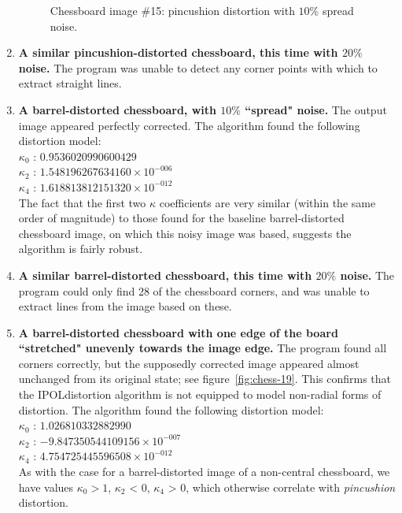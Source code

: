 \begin{enumerate}
\begin{figure}[h]
  \caption{Chessboard image \#15: pincushion distortion with $10\%$ spread noise.}
  \label{fig:chess-15}
\end{figure}
  \item \textbf{A similar pincushion-distorted chessboard, this time with $20\%$ noise.} The program was unable to detect any corner points with which to extract straight lines.
  \item \textbf{A barrel-distorted chessboard, with $10\%$ ``spread" noise.} The output image appeared perfectly corrected. The algorithm found the following distortion model:\\
   $ \kappa_{0}$ : $0.9536020990600429$\\
   $ \kappa_{2}$ : $1.548196267634160 \times 10^{-006}$\\
   $ \kappa_{4}$ : $1.618813812151320 \times 10^{-012}$\\
   The fact that the first two $\kappa$ coefficients are very similar (within the same order of magnitude) to those found for the baseline barrel-distorted chessboard image, on which this noisy image was based, suggests the algorithm is fairly robust.
  \item \textbf{A similar barrel-distorted chessboard, this time with $20\%$ noise.} The program could only find 28 of the chessboard corners, and was unable to extract lines from the image based on these.
  \item \textbf{A barrel-distorted chessboard with one edge of the board ``stretched" unevenly towards the image edge.} The program found all corners correctly, but the supposedly corrected image appeared almost unchanged from its original state; see figure~\ref{fig:chess-19}. This confirms that the IPOLdistortion algorithm is not equipped to model non-radial forms of distortion. The algorithm found the following distortion model:\\
   $ \kappa_{0}$ : $1.026810332882990$\\
   $ \kappa_{2}$ : $-9.847350544109156 \times 10^{-007}$\\
   $ \kappa_{4}$ : $4.754725445596508 \times 10^{-012}$\\
  As with the case for a barrel-distorted image of a non-central chessboard, we have values $\kappa_{0} > 1$, $\kappa_{2}$ < 0, $\kappa_{4}$ > 0, which otherwise correlate with \emph{pincushion} distortion.
\begin{figure}[h]
  \centering

\end{figure}
\end{enumerate}
